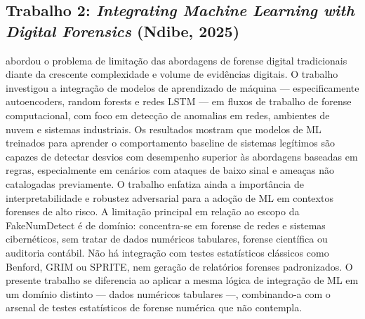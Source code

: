 \documentclass[
    12pt,                %
    openright,           %
    oneside,             %
    a4paper,             %
    english,             %
    brazil               %
]{abntex2}
\begin{document}
\subsection{Trabalho 2: \textit{Integrating Machine Learning with Digital Forensics} (Ndibe, 2025)}
 abordou o problema de limitação das abordagens de forense digital tradicionais diante da crescente complexidade e volume de evidências digitais. O trabalho investigou a integração de modelos de aprendizado de máquina — especificamente autoencoders, random forests e redes LSTM — em fluxos de trabalho de forense computacional, com foco em detecção de anomalias em redes, ambientes de nuvem e sistemas industriais.
Os resultados mostram que modelos de ML treinados para aprender o comportamento baseline de sistemas legítimos são capazes de detectar desvios com desempenho superior às abordagens baseadas em regras, especialmente em cenários com ataques de baixo sinal e ameaças não catalogadas previamente. O trabalho enfatiza ainda a importância de interpretabilidade e robustez adversarial para a adoção de ML em contextos forenses de alto risco.
A limitação principal em relação ao escopo da FakeNumDetect é de domínio:  concentra-se em forense de redes e sistemas cibernéticos, sem tratar de dados numéricos tabulares, forense científica ou auditoria contábil. Não há integração com testes estatísticos clássicos como Benford, GRIM ou SPRITE, nem geração de relatórios forenses padronizados. O presente trabalho se diferencia ao aplicar a mesma lógica de integração de ML em um domínio distinto — dados numéricos tabulares —, combinando-a com o arsenal de testes estatísticos de forense numérica que  não contempla.
\end{document}
